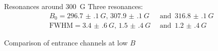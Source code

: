 \begin{frame}[t]{Resonances around \SI{300}{G}}
    Three resonances:
    \setlength{\abovedisplayshortskip}{-15pt}
    \setlength{\abovedisplayskip}{5pt}
    \begin{align*}
        B_0 = \SI{296.7(1)}{G},\,\SI{307.9(1)}{G} \enspace&\text{and}\enspace \SI{316.8(1)}{G} \\
        \text{FWHM} = \SI{3.4(6)}{G},\, \SI{1.5(4)}{G} \enspace&\text{and}\enspace \SI{1.2(4)}{G}
    \end{align*}
\end{frame}

\begin{frame}[t]{Comparison of entrance channels at low $B$}
\end{frame}

